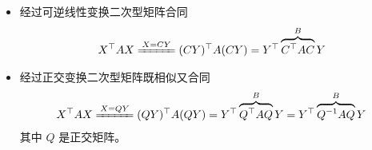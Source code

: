 \begin{itemize}
    \item 经过可逆线性变换二次型矩阵合同
    \begin{equation*}
        \begin{aligned}
            X^\top AX \xlongequal{X = CY} (CY)^\top A (CY)
            = Y^\top \overbrace{C^\top AC}^B Y
        \end{aligned}
    \end{equation*}
    \item 经过正交变换二次型矩阵既相似又合同
    \begin{equation*}
        \begin{aligned}
            X^\top AX \xlongequal{X = QY} (QY)^\top A (QY)
            = Y^\top \overbrace{Q^\top AQ}^B Y = Y^\top \overbrace{Q^{-1} AQ}^B Y 
        \end{aligned}
    \end{equation*}
    其中 $ Q $ 是正交矩阵。
\end{itemize}

